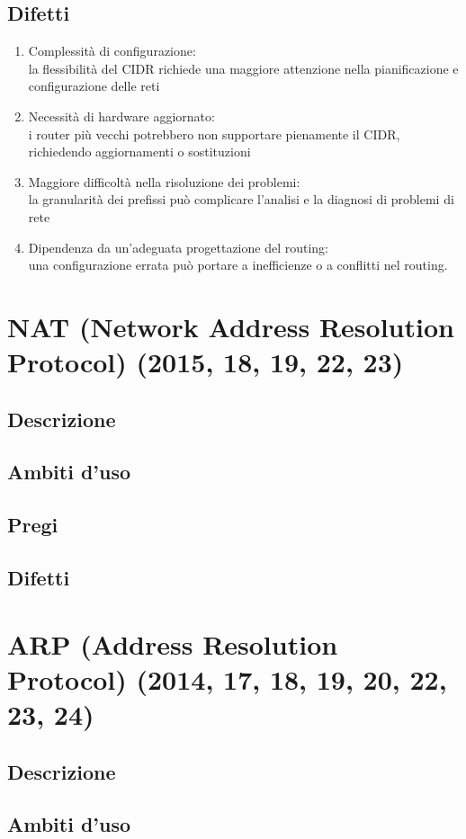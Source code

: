 \documentclass[10pt,oneside,a4paper]{article}
\begin{document}
\subsection{Difetti}
\begin{enumerate}
\item Complessità di configurazione:\\
la flessibilità del CIDR richiede una maggiore attenzione nella pianificazione e configurazione delle reti
\item Necessità di hardware aggiornato:\\
i router più vecchi potrebbero non supportare pienamente il CIDR, richiedendo aggiornamenti o sostituzioni
\item Maggiore difficoltà nella risoluzione dei problemi:\\
la granularità dei prefissi può complicare l'analisi e la diagnosi di problemi di rete
\item Dipendenza da un'adeguata progettazione del routing:\\
una configurazione errata può portare a inefficienze o a conflitti nel routing.
\end{enumerate}
\section{NAT (Network Address Resolution Protocol) (2015, 18, 19, 22, 23)}
\subsection{Descrizione}
\subsection{Ambiti d'uso}
\subsection{Pregi}
\subsection{Difetti}
\section{ARP (Address Resolution Protocol) (2014, 17, 18, 19, 20, 22, 23, 24)}
\subsection{Descrizione}
\subsection{Ambiti d'uso}
\end{document}
